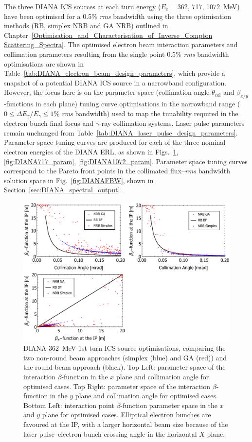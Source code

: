 \documentclass[../main.tex]{subfiles}
\begin{document}
The three DIANA ICS sources at each turn energy ($E_{e}=$362, 717, 1072~\si{\mega\electronvolt}) have been optimised for a 0.5\% \textit{rms} bandwidth using the three optimisation methods (RB, simplex NRB and GA NRB) outlined in Chapter~\ref{Optimisation_and_Characterisation_of_Inverse_Compton Scattering_Spectra}. The optimised electron beam interaction parameters and collimation parameters resulting from the single point 0.5\% \textit{rms} bandwidth optimisations are shown in Table~\ref{tab:DIANA_electron_beam_design_parameters}, which provide a snapshot of a potential DIANA ICS source in a narrowband configuration. However, the focus here is on the parameter space (collimation angle $\theta_{\mathrm{col}}$ and $\beta_{x/y}$-functions in each plane) tuning curve optimisations in the narrowband range ($0 \leq \Delta E_{\gamma}/E_{\gamma} \leq 1$\% \textit{rms} bandwidth) used to map the tunability required in the electron bunch final focus and $\gamma$-ray collimation systems. Laser pulse parameters remain unchanged from Table~\ref{tab:DIANA_laser_pulse_design_parameters}. Parameter space tuning curves are produced for each of the three nominal electron energies of the DIANA ERL, as shown in Figs.~\ref{fig:DIANA362_param}, \ref{fig:DIANA717_param}, \ref{fig:DIANA1072_param}. Parameter space tuning curves correspond to the Pareto front points in the collimated flux--\textit{rms} bandwidth solution space in Fig.~\ref{fig:DIANAFBW}, shown in Section~\ref{sec:DIANA_spectral_output}.
\begin{figure}[!h]
\centering
\includegraphics[width=\textwidth]{Figures/DIANA_Inverse_Compton_Source_Design/DIANA362param.pdf}
\caption{DIANA 362~\si{\mega\electronvolt} 1st turn ICS source optimisations, comparing the two non-round beam approaches (simplex (blue) and GA (red)) and the round beam approach (black). Top Left: parameter space of the interaction $\beta$-function in the $x$ plane and collimation angle for optimised cases. Top Right: parameter space of the interaction $\beta$-function in the $y$ plane and collimation angle for optimised cases.  Bottom Left: interaction point $\beta$-function parameter space in the $x$ and $y$ plane for optimised cases. Elliptical electron bunches are favoured at the IP, with a larger horizontal beam size because of the laser pulse--electron bunch crossing angle in the horizontal $X$ plane.}
\label{fig:DIANA362_param}
\end{figure}
\end{document}
